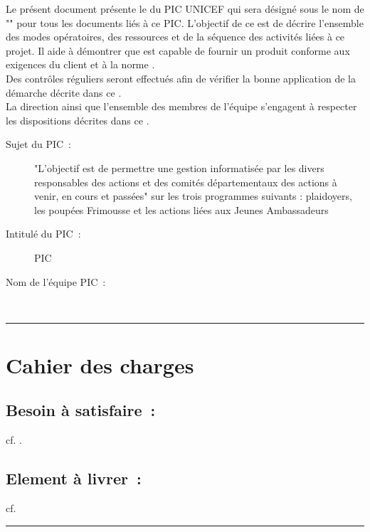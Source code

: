 		Le présent document présente le \PQ{} du PIC UNICEF qui sera désigné sous le nom de "\nomEquipe" pour tous les documents liés à ce PIC. L'objectif de ce \PQ{} est de décrire l'ensemble des modes opératoires, des ressources et de la séquence des activités liées à ce projet. Il aide à démontrer que \nomEquipe{} est capable de fournir un produit conforme aux exigences du client et à la norme \ISO . \\
		
		Des contrôles réguliers seront effectués afin de vérifier la bonne application de la démarche décrite dans ce \PQ .\\
		
		La direction ainsi que l'ensemble des membres de l'équipe \nomEquipe{} s'engagent à respecter les dispositions décrites dans ce \PQ .\\ 
		

		
	\begin{description}
		\item[Sujet du PIC~:] "L'objectif est de permettre une gestion informatisée par les divers responsables des actions et des comités départementaux des actions à venir, en cours et passées" sur les trois programmes suivants : plaidoyers, les poupées Frimousse et les actions liées aux Jeunes Ambassadeurs \\	
		\item[Intitulé du PIC~:] PIC \nomPIC \\	
		\item[Nom de l'équipe PIC~:] \nomEquipe \\
	\end{description}


\noindent\hfil\rule{\textwidth}{.4pt}\hfil


		
\section*{Cahier des charges}
		\subsection*{Besoin à satisfaire~:} 
			cf. \DSE . 		
		\subsection*{Element à livrer~:}
			cf. \DSE
			
					


	\vspace{1cm}
	\noindent\hfil\rule{\textwidth}{.4pt}\hfil
	\vspace{1cm}	
	

